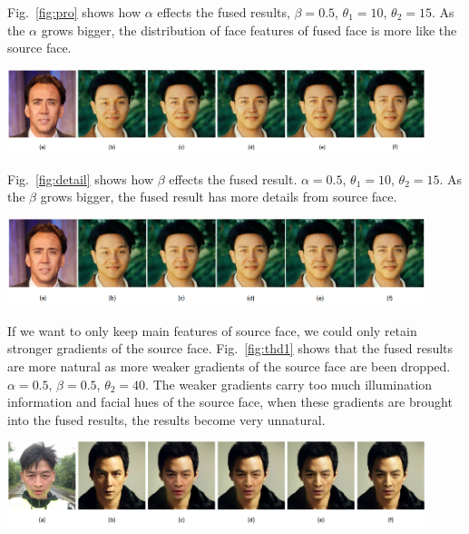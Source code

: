 Fig.~\ref{fig:pro} shows how $\alpha$ effects the fused results, $\beta = 0.5$, $\theta_1 = 10$, $\theta_2 = 15$. As the $\alpha$ grows bigger, the distribution of face features of fused face is more like the source face.

\begin{center}
    \includegraphics[width=4.8in]{images/pro.png}
    \label{fig:pro}
\end{center}

Fig.~\ref{fig:detail} shows how $\beta$ effects the fused result. $\alpha = 0.5$, $\theta_1 = 10$, $\theta_2 = 15$. As the $\beta$ grows bigger, the fused result has more details from source face.

\begin{center}
    \includegraphics[width=4.8in]{images/detail.png}
    \label{fig:detail}
\end{center}

If we want to only keep main features of source face, we could only retain stronger gradients of the source face. Fig.~\ref{fig:thd1} shows that the fused results are more natural as more weaker gradients of the source face are been dropped. $\alpha = 0.5$, $\beta = 0.5$, $\theta_2 = 40$. The weaker gradients carry too much illumination information and facial hues of the source face, when these gradients are brought into the fused results, the results become very unnatural.

\begin{center}
    \includegraphics[width=4.8in]{images/thd1.png}
    \label{fig:thd1}
\end{center}


